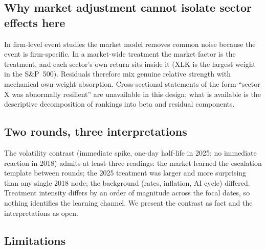 \documentclass[11pt,a4paper]{article}
\begin{document}
\subsection{Why market adjustment cannot isolate sector effects here}
\label{sec:es-discussion}

In firm-level event studies the market model removes common noise because
the event is firm-specific. In a market-wide treatment the market factor
is the treatment, and each sector's own return sits inside it
(XLK is the largest weight in the S\&P~500). Residuals therefore mix
genuine relative strength with mechanical own-weight absorption.
Cross-sectional statements of the form ``sector X was abnormally
resilient'' are unavailable in this design; what is available is the
descriptive decomposition of rankings into beta and residual components.

\subsection{Two rounds, three interpretations}\label{sec:learning}

The volatility contrast (immediate spike, one-day half-life in 2025; no
immediate reaction in 2018) admits at least three readings: the market
learned the escalation template between rounds; the 2025 treatment was
larger and more surprising than any single 2018 node; the background
(rates, inflation, AI cycle) differed. Treatment intensity differs by an
order of magnitude across the focal dates, so nothing identifies the
learning channel. We present the contrast as fact and the interpretations
as open.

\subsection{Limitations}\label{sec:limitations}
\end{document}
